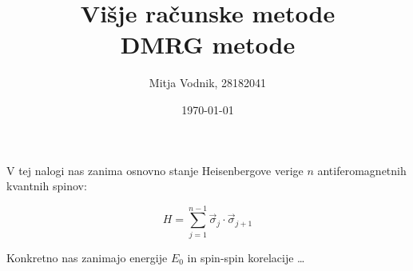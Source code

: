 \documentclass[a4paper]{article}
\newcommand{\s}{\sigma}
\newcommand{\vs}{\vec{\s}}
\begin{document}
    \title{\sc\large Višje računske metode\\
		\bigskip
		\bf\Large DMRG metode}
	\author{Mitja Vodnik, 28182041}
            \date{\today}
	\maketitle

    V tej nalogi nas zanima osnovno stanje Heisenbergove verige $n$ antiferomagnetnih kvantnih spinov:

    \begin{equation}\label{eq1}
        H = \sum_{j=1}^{n-1} \vs_j \cdot \vs_{j+1}
    \end{equation}

    Konkretno nas zanimajo energije $E_0$ in spin-spin korelacije \ldots

    \iffalse
    \begin{figure}
        \centering
        \texttt{[image: slika1.pdf]}
        \caption{Odvisnost entropije prepletenosti simetrične biparticije osnovnega stanja od dolžine verige. Dolžine verig na tem grafu so le sode.}
        \label{slika1}
    \end{figure}

    \begin{figure}
        \centering
        \begin{subfigure}{\textwidth}
            \texttt{[image: slika4a.pdf]}
        \end{subfigure}
        \begin{subfigure}{\textwidth}
            \texttt{[image: slika4b.pdf]}
        \end{subfigure}
        \caption{Odvisnost entropije prepletenosti od velikosti blokov biparticije osnovnega stanja s periodičnimi robnimi pogoji.}
        \label{slika4}
    \end{figure}
    \fi
\end{document}
